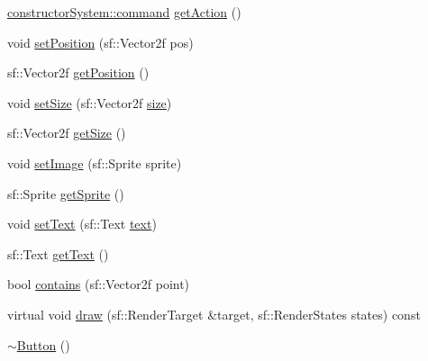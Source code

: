 \begin{DoxyCompactItemize}
\item 
\hyperlink{classant_1_1constructor_system_a0977052dc8865f8e79ae03b4f3e18d8a}{constructor\+System\+::command} \hyperlink{classant_1_1_g_u_i_1_1_button_a3641c630ff0b157f0cd1731f506a5ba5}{get\+Action} ()
\item 
void \hyperlink{classant_1_1_g_u_i_1_1_button_a40c2a59d4cb4ed6d496a6452aebef114}{set\+Position} (sf\+::\+Vector2f pos)
\item 
sf\+::\+Vector2f \hyperlink{classant_1_1_g_u_i_1_1_button_acae89fe8d5f555fd6cd4d4c8a9fbf2d0}{get\+Position} ()
\item 
void \hyperlink{classant_1_1_g_u_i_1_1_button_a06ff92ecc804313939f8f275abbec86d}{set\+Size} (sf\+::\+Vector2f \hyperlink{classant_1_1_g_u_i_1_1_button_a6c6e3fddc805d48d43990ba533aeb01d}{size})
\item 
sf\+::\+Vector2f \hyperlink{classant_1_1_g_u_i_1_1_button_a24c67e31cd936b4894ed1d1b1589c641}{get\+Size} ()
\item 
void \hyperlink{classant_1_1_g_u_i_1_1_button_a55b1b4ac34be57937ea7f925c04dc0c3}{set\+Image} (sf\+::\+Sprite sprite)
\item 
sf\+::\+Sprite \hyperlink{classant_1_1_g_u_i_1_1_button_ae7163fdc0718818fb0d2d48270a55892}{get\+Sprite} ()
\item 
void \hyperlink{classant_1_1_g_u_i_1_1_button_a1cd9f8a0446b9200e3a12b2b6e4aa2ed}{set\+Text} (sf\+::\+Text \hyperlink{classant_1_1_g_u_i_1_1_button_a1b7b25b11fa7522434fe6d9d5ac79d95}{text})
\item 
sf\+::\+Text \hyperlink{classant_1_1_g_u_i_1_1_button_a7f02f9ff7abbd81882e1dcd264ea9d8e}{get\+Text} ()
\item 
bool \hyperlink{classant_1_1_g_u_i_1_1_button_a2944325921fa8faddb26a7f78f3c6ae7}{contains} (sf\+::\+Vector2f point)
\item 
virtual void \hyperlink{classant_1_1_g_u_i_1_1_button_ab70e712e742c330615ef16c4f072544a}{draw} (sf\+::\+Render\+Target \&target, sf\+::\+Render\+States states) const 
\item 
\hyperlink{classant_1_1_g_u_i_1_1_button_aae3aa14cee3f4e58c558f2905a473ba9}{$\sim$\+Button} ()
\end{DoxyCompactItemize}
